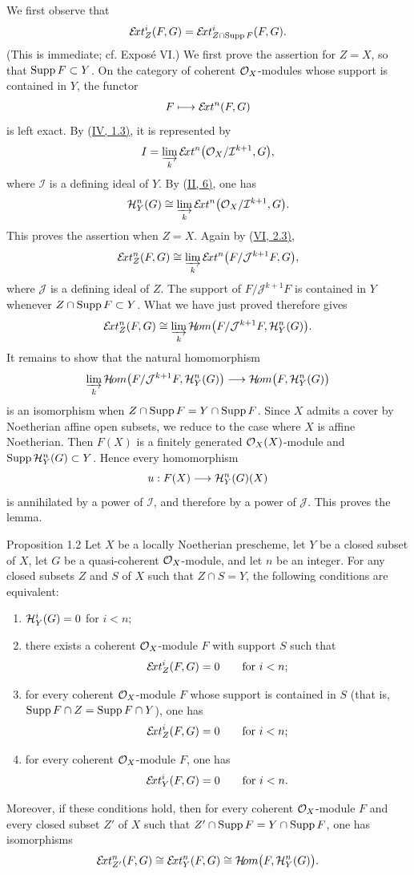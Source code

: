 We first observe that
\[
  \mathcal E\!xt_Z^i(F,G)
  =\mathcal E\!xt_{Z\cap\operatorname{Supp} F}^i(F,G).
\]
(This is immediate; cf. Expos\'e VI.) We first prove the assertion for
$Z=X$, so that $\operatorname{Supp} F\subset Y$. On the category of coherent $\mathcal O_X$-modules
whose support is contained in $Y$, the functor
\[
  F\longmapsto\mathcal E\!xt^n(F,G)
\]
is left exact. By (\hyperref[IV.1.3]{IV, 1.3)}, it is represented by
\[
  I=\varinjlim_k\mathcal E\!xt^n
    \bigl(\mathcal O_X/\mathcal I^{k+1},G\bigr),
\]
where $\mathcal I$ is a defining ideal of $Y$. By (\hyperref[II.6]{II, 6)}, one has
\[
  \mathcal H_Y^n(G)\cong
  \varinjlim_k\mathcal E\!xt^n
    \bigl(\mathcal O_X/\mathcal I^{k+1},G\bigr).
\]
This proves the assertion when $Z=X$. Again by (\hyperref[VI.2.3]{VI, 2.3)},
\[
  \mathcal E\!xt_Z^n(F,G)\cong
  \varinjlim_k\mathcal E\!xt^n
    \bigl(F/\mathcal J^{k+1}F,G\bigr),
\]
where $\mathcal J$ is a defining ideal of $Z$. The support of
$F/\mathcal J^{k+1}F$ is contained in $Y$ whenever
$Z\cap\operatorname{Supp} F\subset Y$. What we have just proved therefore gives
\[
  \mathcal E\!xt_Z^n(F,G)\cong
  \varinjlim_k\mathcal H\!om
    \bigl(F/\mathcal J^{k+1}F,\mathcal H_Y^n(G)\bigr).
\]
It remains to show that the natural homomorphism
\[
  \varinjlim_k\mathcal H\!om
    \bigl(F/\mathcal J^{k+1}F,\mathcal H_Y^n(G)\bigr)
  \longrightarrow
  \mathcal H\!om\bigl(F,\mathcal H_Y^n(G)\bigr)
\]
is an isomorphism when $Z\cap\operatorname{Supp} F=Y\cap\operatorname{Supp} F$. Since $X$ admits a cover by
Noetherian affine open subsets, we reduce to the case where $X$ is affine
Noetherian. Then $F(X)$ is a finitely generated $\mathcal O_X(X)$-module and
$\operatorname{Supp}\mathcal H_Y^n(G)\subset Y$. Hence every homomorphism
\[
  u:F(X)\longrightarrow\mathcal H_Y^n(G)(X)
\]
is annihilated by a power of $\mathcal I$, and therefore by a power of
$\mathcal J$. This proves the lemma.

\begin{sgastatement}{Proposition 1.2}
Let $X$ be a locally Noetherian prescheme, let $Y$ be a closed subset of $X$,
let $G$ be a quasi-coherent $\mathcal O_X$-module, and let $n$ be an integer. For any
closed subsets $Z$ and $S$ of $X$ such that $Z\cap S=Y$, the following
conditions are equivalent:
\begin{enumerate}
  \renewcommand{\labelenumi}{(\roman{enumi})}
  \item $\mathcal H_Y^i(G)=0$ for $i<n$;
  \item there exists a coherent $\mathcal O_X$-module $F$ with support $S$ such that
  \[
    \mathcal E\!xt_Z^i(F,G)=0\qquad\text{for }i<n;
  \]
  \item for every coherent $\mathcal O_X$-module $F$ whose support is contained in $S$
  (that is, $\operatorname{Supp} F\cap Z=\operatorname{Supp} F\cap Y$), one has
  \[
    \mathcal E\!xt_Z^i(F,G)=0\qquad\text{for }i<n;
  \]
  \item for every coherent $\mathcal O_X$-module $F$, one has
  \[
    \mathcal E\!xt_Y^i(F,G)=0\qquad\text{for }i<n.
  \]
\end{enumerate}
Moreover, if these conditions hold, then for every coherent $\mathcal O_X$-module $F$
and every closed subset $Z'$ of $X$ such that
$Z'\cap\operatorname{Supp} F=Y\cap\operatorname{Supp} F$, one has isomorphisms
\[
  \mathcal E\!xt_{Z'}^n(F,G)\cong
  \mathcal E\!xt_Y^n(F,G)\cong
  \mathcal H\!om\bigl(F,\mathcal H_Y^n(G)\bigr).
\]
\end{sgastatement}

